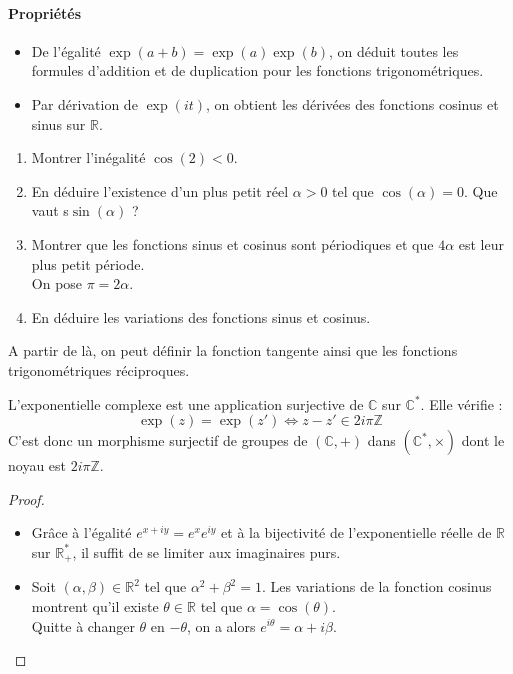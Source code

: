 \documentclass[french]{article}
\newcommand{\Z}{\mathbb{Z}}
\newcommand{\R}{\mathbb{R}}
\newcommand{\C}{\mathbb{C}}
\newcommand{\st}{^*}
\theoremstyle{plain}
\theoremstyle{definition}
\theoremstyle{remark}
\begin{document}
\paragraph{Propriétés}
\begin{itemize}
	\item De l'égalité $\exp(a+b)=\exp(a)\exp(b)$, on déduit toutes les formules d'addition et de duplication pour les fonctions trigonométriques.
	\item Par dérivation de $\exp(it)$, on obtient les dérivées des fonctions cosinus et sinus sur $\R$.
\end{itemize}

\begin{exo}
	\begin{enumerate}
		\item Montrer l'inégalité $\cos(2)<0$.
		\item En déduire l'existence d'un plus petit réel $\alpha>0$ tel que $\cos(\alpha)=0$. Que vaut s$\sin(\alpha)$ ?
		\item Montrer que les fonctions sinus et cosinus sont périodiques et que $4\alpha$ est leur plus petit période.\\
		On pose $\pi=2\alpha$.
		\item En déduire les variations des fonctions sinus et cosinus.
	\end{enumerate}
\end{exo}

A partir de là, on peut définir la fonction tangente ainsi que les fonctions trigonométriques réciproques.

\begin{prop}%
	L'exponentielle complexe est une application surjective de $\C$ sur $\C\st$. Elle vérifie : $$\exp(z)=\exp(z')\iff z-z'\in 2i\pi\Z$$
	C'est donc un morphisme surjectif de groupes de $(\C,+)$ dans $(\C\st,\times)$ dont le noyau est $2i\pi\Z$.
\end{prop}
\begin{proof}
	\begin{itemize}
		\item Grâce à l'égalité $e^{x+iy}=e^xe^{iy}$ et à la bijectivité de l'exponentielle réelle de $\R$ sur $\R_+\st$, il suffit de se limiter aux imaginaires purs. 
		\item Soit $(\alpha,\beta)\in\R^2$ tel que $\alpha^2+\beta^2=1$. Les variations de la fonction cosinus montrent qu'il existe $\theta\in\R$ tel que $\alpha=\cos(\theta)$. \\
		Quitte à changer $\theta$ en $-\theta$, on a alors $e^{i\theta}=\alpha+i\beta$.
	\end{itemize}
\end{proof}
\end{document}
